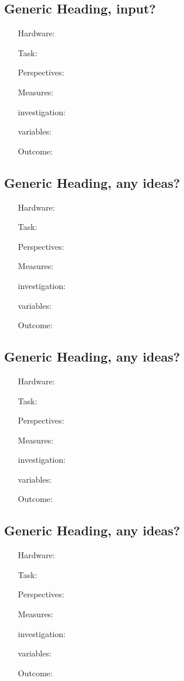 \subsection{Generic Heading, input? \todo}
\begin{itemize}
	\item[Hardware:] 
	\item[Task:] 
	\item[Perspectives:] 
	\item[Measures:] 
	\item[investigation:] 
	\item[variables:] 
	\item[Outcome:] 
\end{itemize}

\subsection{Generic Heading, any ideas? \todo}
\begin{itemize}
	\item[Hardware:] 
	\item[Task:] 
	\item[Perspectives:] 
	\item[Measures:] 
	\item[investigation:] 
	\item[variables:] 
	\item[Outcome:] 
\end{itemize}

\subsection{Generic Heading, any ideas? \todo}
\begin{itemize}
	\item[Hardware:] 
	\item[Task:] 
	\item[Perspectives:] 
	\item[Measures:] 
	\item[investigation:] 
	\item[variables:] 
	\item[Outcome:] 
\end{itemize}

\subsection{Generic Heading, any ideas? \todo}
\begin{itemize}
	\item[Hardware:] 
	\item[Task:] 
	\item[Perspectives:] 
	\item[Measures:] 
	\item[investigation:] 
	\item[variables:] 
	\item[Outcome:] 
\end{itemize}

